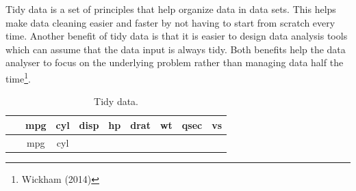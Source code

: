 \documentclass[12pt,oneside]{reedthesis}
\theoremstyle{definition}
\theoremstyle{definition}
\theoremstyle{definition}
\theoremstyle{remark}
\begin{document}
Tidy data is a set of principles that help organize data in data sets.
This helps make data cleaning easier and faster by not having to start
from scratch every time. Another benefit of tidy data is that it is
easier to design data analysis tools which can assume that the data
input is always tidy. Both benefits help the data analyser to focus on
the underlying problem rather than managing data half the time\footnote{Wickham
  (2014)}.
\begin{longtable}[]{@{}ccccccccc@{}}
\caption{Tidy data.}\tabularnewline
\toprule
\begin{minipage}[b]{0.24\columnwidth}\centering\strut
~\strut
\end{minipage} & \begin{minipage}[b]{0.07\columnwidth}\centering\strut
mpg\strut
\end{minipage} & \begin{minipage}[b]{0.06\columnwidth}\centering\strut
cyl\strut
\end{minipage} & \begin{minipage}[b]{0.07\columnwidth}\centering\strut
disp\strut
\end{minipage} & \begin{minipage}[b]{0.06\columnwidth}\centering\strut
hp\strut
\end{minipage} & \begin{minipage}[b]{0.07\columnwidth}\centering\strut
drat\strut
\end{minipage} & \begin{minipage}[b]{0.08\columnwidth}\centering\strut
wt\strut
\end{minipage} & \begin{minipage}[b]{0.08\columnwidth}\centering\strut
qsec\strut
\end{minipage} & \begin{minipage}[b]{0.04\columnwidth}\centering\strut
vs\strut
\end{minipage}\tabularnewline
\midrule
\endfirsthead
\toprule
\begin{minipage}[b]{0.24\columnwidth}\centering\strut
~\strut
\end{minipage} & \begin{minipage}[b]{0.07\columnwidth}\centering\strut
mpg\strut
\end{minipage} & \begin{minipage}[b]{0.06\columnwidth}\centering\strut
cyl\strut
\end{minipage} & \begin{minipage}[b]{0.07\columnwidth}\centering\strut

\end{minipage}
\end{longtable}
\end{document}
